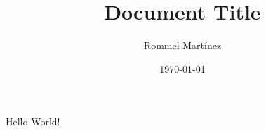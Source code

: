\documentclass{article}
\title{Document Title}
\date{\today}
\author{Rommel Mart\'{i}nez}
\begin{document}
  \maketitle
  \newpage
  Hello World!
\end{document}
